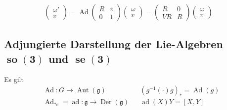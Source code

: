 \documentclass[paper=A4, twoside, chapterprefix=true, bibliography=totoc, headsepline]{scrbook}
\DeclareMathOperator{\ad}{ad}
\DeclareMathOperator{\se}{se}
\DeclareMathOperator{\so}{so}
\DeclareMathOperator{\Ad}{Ad}
\DeclareMathOperator{\Aut}{Aut} %
\DeclareMathOperator{\Der}{Der}
\theoremstyle{nonumberbreak}
\theoremstyle{emptybreak}
\theoremstyle{break}
\begin{document}
\begin{align*}
	\begin{pmatrix}
		\omega' \\ v
	\end{pmatrix}
	=
	\Ad
	\left(\begin{array}{c|c}
		R & \overline v \\ \hline
		0 & 1
	\end{array}\right)
	\begin{pmatrix}
		\omega \\ v
	\end{pmatrix}
	=
	\begin{pmatrix}
		R & 0 \\
		V R & R
	\end{pmatrix}
	\begin{pmatrix}
		\omega \\ v
	\end{pmatrix}
\end{align*}


\subsection*{Adjungierte Darstellung der Lie-Algebren $\bm{\so(3)}$ und $\bm{\se(3)}$}

Es gilt
\begin{align*}
	&\Ad: G \to \Aut(\mathfrak g) && (g^{-1} (\cdot) g)_{*} = \Ad(g) \\
	&\Ad_{*e} = \ad: \mathfrak g \to \Der(\mathfrak g) && \ad(X)Y = [X, Y]
\end{align*}
\end{document}
